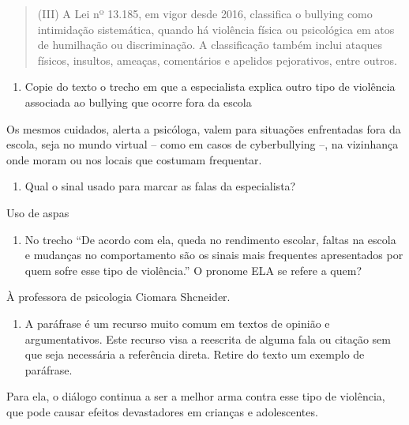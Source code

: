 {\begin{quote}
(III) A Lei nº 13.185, em vigor desde 2016, classifica o bullying como
intimidação sistemática, quando há violência física ou psicológica em
atos de humilhação ou discriminação. A classificação também inclui
ataques físicos, insultos, ameaças, comentários e apelidos pejorativos,
entre outros.
\end{quote}

\begin{enumerate}
\def\labelenumi{\arabic{enumi})}
\setcounter{enumi}{5}
\tightlist
\item
  Copie do texto o trecho em que a especialista explica outro tipo de
  violência associada ao bullying que ocorre fora da escola
\end{enumerate}

Os mesmos cuidados, alerta a psicóloga, valem para situações enfrentadas
fora da escola, seja no mundo virtual -- como em casos de cyberbullying
--, na vizinhança onde moram ou nos locais que costumam frequentar.

\begin{enumerate}
\def\labelenumi{\arabic{enumi})}
\setcounter{enumi}{6}
\tightlist
\item
  Qual o sinal usado para marcar as falas da especialista?
\end{enumerate}

Uso de aspas

\begin{enumerate}
\def\labelenumi{\arabic{enumi})}
\setcounter{enumi}{7}
\tightlist
\item
  No trecho ``De acordo com ela, queda no rendimento escolar, faltas na
  escola e mudanças no comportamento são os sinais mais frequentes
  apresentados por quem sofre esse tipo de violência.'' O pronome ELA se
  refere a quem?
\end{enumerate}

À professora de psicologia Ciomara Shcneider.

\begin{enumerate}
\def\labelenumi{\arabic{enumi})}
\setcounter{enumi}{8}
\tightlist
\item
  A paráfrase é um recurso muito comum em textos de opinião e
  argumentativos. Este recurso visa a reescrita de alguma fala ou
  citação sem que seja necessária a referência direta. Retire do texto
  um exemplo de paráfrase.
\end{enumerate}

Para ela, o diálogo continua a ser a melhor arma contra esse tipo de
violência, que pode causar efeitos devastadores em crianças e
adolescentes.

}

